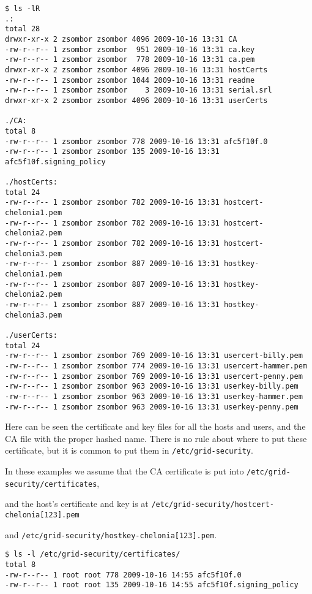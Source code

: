 \documentclass{article}
\begin{document}
\begin{verbatim}
$ ls -lR
.:
total 28
drwxr-xr-x 2 zsombor zsombor 4096 2009-10-16 13:31 CA
-rw-r--r-- 1 zsombor zsombor  951 2009-10-16 13:31 ca.key
-rw-r--r-- 1 zsombor zsombor  778 2009-10-16 13:31 ca.pem
drwxr-xr-x 2 zsombor zsombor 4096 2009-10-16 13:31 hostCerts
-rw-r--r-- 1 zsombor zsombor 1044 2009-10-16 13:31 readme
-rw-r--r-- 1 zsombor zsombor    3 2009-10-16 13:31 serial.srl
drwxr-xr-x 2 zsombor zsombor 4096 2009-10-16 13:31 userCerts

./CA:
total 8
-rw-r--r-- 1 zsombor zsombor 778 2009-10-16 13:31 afc5f10f.0
-rw-r--r-- 1 zsombor zsombor 135 2009-10-16 13:31 afc5f10f.signing_policy

./hostCerts:
total 24
-rw-r--r-- 1 zsombor zsombor 782 2009-10-16 13:31 hostcert-chelonia1.pem
-rw-r--r-- 1 zsombor zsombor 782 2009-10-16 13:31 hostcert-chelonia2.pem
-rw-r--r-- 1 zsombor zsombor 782 2009-10-16 13:31 hostcert-chelonia3.pem
-rw-r--r-- 1 zsombor zsombor 887 2009-10-16 13:31 hostkey-chelonia1.pem
-rw-r--r-- 1 zsombor zsombor 887 2009-10-16 13:31 hostkey-chelonia2.pem
-rw-r--r-- 1 zsombor zsombor 887 2009-10-16 13:31 hostkey-chelonia3.pem

./userCerts:
total 24
-rw-r--r-- 1 zsombor zsombor 769 2009-10-16 13:31 usercert-billy.pem
-rw-r--r-- 1 zsombor zsombor 774 2009-10-16 13:31 usercert-hammer.pem
-rw-r--r-- 1 zsombor zsombor 769 2009-10-16 13:31 usercert-penny.pem
-rw-r--r-- 1 zsombor zsombor 963 2009-10-16 13:31 userkey-billy.pem
-rw-r--r-- 1 zsombor zsombor 963 2009-10-16 13:31 userkey-hammer.pem
-rw-r--r-- 1 zsombor zsombor 963 2009-10-16 13:31 userkey-penny.pem
\end{verbatim}

Here can be seen the certificate and key files for all the hosts and users, and the CA file with the proper hashed name.
There is no rule about where to put these certificate, but it is common to put them in \verb!/etc/grid-security!.

In these examples we assume that the CA certificate is put into \verb!/etc/grid-security/certificates!,

and the host's certificate and key is at \verb!/etc/grid-security/hostcert-chelonia[123].pem!

and \verb!/etc/grid-security/hostkey-chelonia[123].pem!.

\begin{verbatim}
$ ls -l /etc/grid-security/certificates/
total 8
-rw-r--r-- 1 root root 778 2009-10-16 14:55 afc5f10f.0
-rw-r--r-- 1 root root 135 2009-10-16 14:55 afc5f10f.signing_policy
\end{verbatim}
\end{document}
